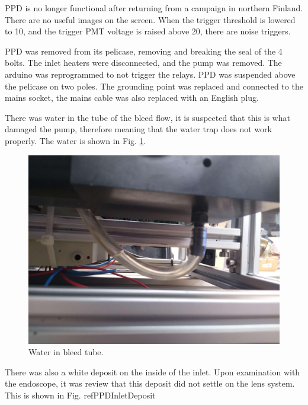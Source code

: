 

PPD is no longer functional after returning from a campaign in northern Finland. There are no useful images on the screen. When the trigger threshold is lowered to 10, and the trigger PMT voltage is raised above 20, there are noise triggers.

PPD was removed from its pelicase, removing and breaking the seal of the 4 bolts. The inlet heaters were disconnected, and the pump was removed. The arduino was reprogrammed to not trigger the relays. PPD was suspended above  the pelicase on two poles. The grounding point was replaced and connected to the mains socket, the mains cable was also replaced with an English plug.

There was water in the tube of the bleed flow, it is suspected that this is what damaged the pump, therefore meaning that the water trap does not work properly. The water is shown in Fig. \ref{fig:PPDWaterTube}.

\begin{figure}[H]
\begin{center}
\includegraphics[width=0.5\linewidth]{Figures/PPDWaterTube}
\end{center}
\caption{Water in bleed tube.}
\label{fig:PPDWaterTube}
\end{figure}

There was also a white deposit on the inside of the inlet. Upon examination with the endoscope, it was review that this deposit did not settle on the lens system. This is shown in Fig. ref{PPDInletDeposit}

